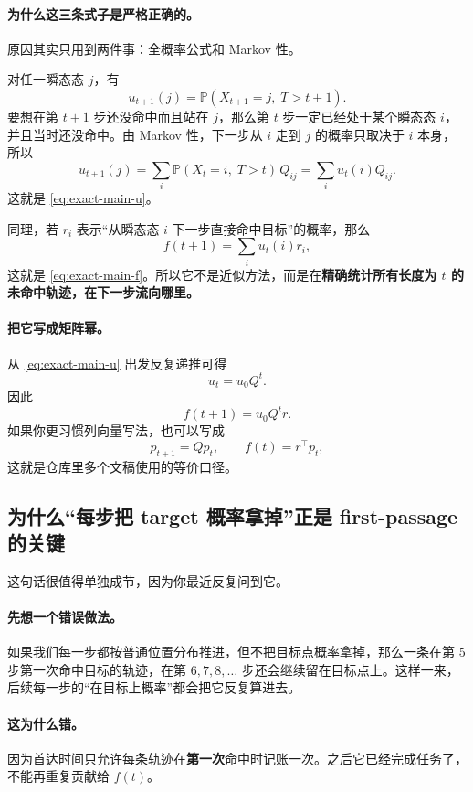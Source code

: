 \documentclass[11pt,fontset=fandol]{ctexart}
\begin{document}
\paragraph{为什么这三条式子是严格正确的。}
原因其实只用到两件事：全概率公式和 Markov 性。

对任一瞬态态 $j$，有
\[
  u_{t+1}(j)
  =
  \mathbb P(X_{t+1}=j,\;T>t+1).
\]
要想在第 $t+1$ 步还没命中而且站在 $j$，那么第 $t$ 步一定已经处于某个瞬态态 $i$，并且当时还没命中。由 Markov 性，下一步从 $i$ 走到 $j$ 的概率只取决于 $i$ 本身，所以
\[
  u_{t+1}(j)=\sum_i \mathbb P(X_t=i,\;T>t)\,Q_{ij}
  =
  \sum_i u_t(i)Q_{ij}.
\]
这就是 \eqref{eq:exact-main-u}。

同理，若 $r_i$ 表示“从瞬态态 $i$ 下一步直接命中目标”的概率，那么
\[
  f(t+1)=\sum_i u_t(i)r_i,
\]
这就是 \eqref{eq:exact-main-f}。所以它不是近似方法，而是在\textbf{精确统计所有长度为 $t$ 的未命中轨迹，在下一步流向哪里。}

\paragraph{把它写成矩阵幂。}
从 \eqref{eq:exact-main-u} 出发反复递推可得
\begin{equation}
  u_t = u_0 Q^t.
  \label{eq:ut-power}
\end{equation}
因此
\begin{equation}
  f(t+1)=u_0Q^t r.
  \label{eq:f-power}
\end{equation}
如果你更习惯列向量写法，也可以写成
\[
  p_{t+1}=Qp_t,\qquad f(t)=r^\top p_t,
\]
这就是仓库里多个文稿使用的等价口径。

\subsection*{为什么“每步把 target 概率拿掉”正是 first-passage 的关键}
这句话很值得单独成节，因为你最近反复问到它。

\paragraph{先想一个错误做法。}
如果我们每一步都按普通位置分布推进，但不把目标点概率拿掉，那么一条在第 $5$ 步第一次命中目标的轨迹，在第 $6,7,8,\dots$ 步还会继续留在目标点上。这样一来，后续每一步的“在目标上概率”都会把它反复算进去。

\paragraph{这为什么错。}
因为首达时间只允许每条轨迹在\textbf{第一次}命中时记账一次。之后它已经完成任务了，不能再重复贡献给 $f(t)$。
\end{document}
